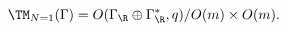 \begin{equation}
\label{eq:MoneO}
  \TM_{N=1}(\Gamma) = O(\Gamma_\R \oplus \Gamma^*_\R,q)/O(m) \times
  O(m).
\end{equation}

